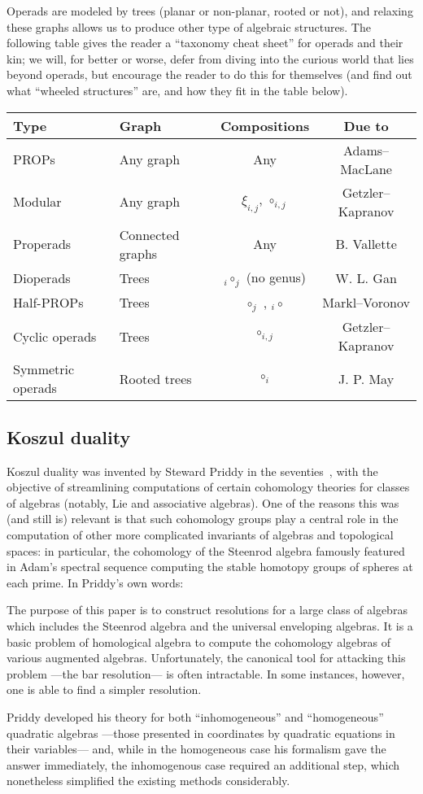 \documentclass[fleqn, a4paper, twoside]{article}
\makeatletter
\newcommand{\0}{\langle 0\rangle}
\let\[\@undefined
\DeclareRobustCommand{\[}{\begin{equation}}%
\let\]\@undefined
\DeclareRobustCommand{\]}{\end{equation}}%
\theoremstyle{mytheorem}
\theoremstyle{introthm}
\theoremstyle{mydefinition}
\theoremstyle{mydefinition2}
\theoremstyle{plain} %
\newcommand{\?}{\,?\,}
\theoremstyle{mytheorem}
\theoremstyle{plain} %
\newcommand\claim[2][.8]{%
  \begin{minipage}{#1\displaywidth}%
  \itshape
  #2
  \end{minipage}%
}
\makeatother
\begin{document}
Operads are modeled by trees (planar or
non-planar, rooted or not), and relaxing these
graphs allows us to produce other type of 
algebraic structures. The following table
gives the reader a ``taxonomy cheat sheet''
for operads and their kin; we will, for better
or worse, defer from diving into the curious
world that lies beyond operads, but encourage
the reader to do this for themselves (and find
out what ``wheeled structures'' are, and how
they fit in the table below).

\begin{center}
\begin{tabular}{@{}llcc@{}} \toprule
Type & Graph & Compositions & Due to \\ \midrule
PROPs & Any graph & Any  & Adams--MacLane \\
Modular & Any graph & $\xi_{i,j}$, $\circ_{i,j}$  & Getzler--Kapranov\\ 
Properads & Connected graphs & Any & B. Vallette \\
Dioperads & Trees & ${}_i\circ_j$ (no genus) & W. L. Gan \\
Half-PROPs & Trees & $\circ_j$ , ${}_i\circ$ & 
 Markl--Voronov \\ 
Cyclic operads & Trees &  $\circ_{i,j}$ & Getzler--Kapranov\\ 
Symmetric operads & Rooted trees & $\circ_i$  & J. P. May \\ 
\bottomrule
\end{tabular}
\end{center}

\subsection{Koszul duality}
 
Koszul duality was invented by Steward Priddy in
the seventies~\cite{Priddy1970}, with the objective of streamlining
computations of certain cohomology theories for
classes of algebras (notably, Lie and associative 
algebras). One of the reasons this was (and still is)
relevant is that such cohomology groups play a central
role in the computation of other more complicated invariants
of algebras and topological spaces: in particular,
the cohomology of the Steenrod algebra famously featured
in Adam's spectral sequence computing the stable homotopy
groups of spheres at each prime. In Priddy's own words:
\[
\claim{
The purpose of this paper is to construct resolutions for a 
large class of algebras which includes the Steenrod algebra
and the universal enveloping algebras. 
It is a basic problem of homological algebra to compute the 
cohomology algebras of various augmented algebras. Unfortunately, 
the canonical tool for attacking this problem ---the bar resolution--- is often intractable. In some instances,
however, one is able to find a simpler resolution.
}
\]
Priddy developed his theory for both ``inhomogeneous''
and ``homogeneous'' quadratic algebras ---those presented
in coordinates by quadratic equations in their variables---
and, while in the homogeneous case his formalism gave the
answer immediately, the inhomogenous case required an
additional step, which nonetheless simplified the existing
methods considerably.  
\end{document}
